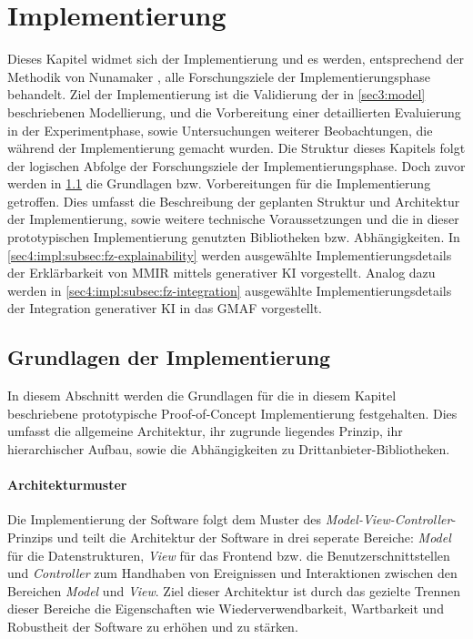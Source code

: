 \section{Implementierung}
\label{sec4:impl}
Dieses Kapitel widmet sich der Implementierung und es werden, entsprechend der Methodik von Nunamaker \cite{nunamaker}, alle Forschungsziele der Implementierungsphase behandelt.
Ziel der Implementierung ist die Validierung der in \cref{sec3:model} beschriebenen Modellierung, und die Vorbereitung einer detaillierten Evaluierung in der Experimentphase, sowie Untersuchungen weiterer Beobachtungen, die während der Implementierung gemacht wurden.
Die Struktur dieses Kapitels folgt der logischen Abfolge der Forschungsziele der Implementierungsphase.
Doch zuvor werden in \cref{sec4:impl:basics} die Grundlagen bzw. Vorbereitungen für die Implementierung getroffen.
Dies umfasst die Beschreibung der geplanten Struktur und Architektur der Implementierung, sowie weitere technische Voraussetzungen und die in dieser prototypischen Implementierung genutzten Bibliotheken bzw. Abhängigkeiten.
In \cref{sec4:impl:subsec:fz-explainability} werden ausgewählte Implementierungsdetails der Erklärbarkeit von MMIR mittels generativer KI vorgestellt.
Analog dazu werden in \cref{sec4:impl:subsec:fz-integration} ausgewählte Implementierungsdetails der Integration generativer KI in das GMAF vorgestellt.

\subsection{Grundlagen der Implementierung}
\label{sec4:impl:basics}
In diesem Abschnitt werden die Grundlagen für die in diesem Kapitel beschriebene prototypische Proof-of-Concept Implementierung festgehalten.
Dies umfasst die allgemeine Architektur, ihr zugrunde liegendes Prinzip, ihr hierarchischer Aufbau, sowie die Abhängigkeiten zu Drittanbieter-Bibliotheken.

\paragraph{Architekturmuster}
Die Implementierung der Software folgt dem Muster des \textit{Model-View-Controller}-Prinzips und teilt die Architektur der Software in drei seperate Bereiche: \textit{Model} für die Datenstrukturen, \textit{View} für das Frontend bzw. die Benutzerschnittstellen und \textit{Controller} zum Handhaben von Ereignissen und Interaktionen zwischen den Bereichen \textit{Model} und \textit{View}.
Ziel dieser Architektur ist durch das gezielte Trennen dieser Bereiche die Eigenschaften wie Wiederverwendbarkeit, Wartbarkeit und Robustheit der Software zu erhöhen und zu stärken.

